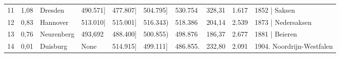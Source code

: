 \begin{tabular}{llllllllll}
11 &               1,08 &             Dresden &   490.571] &     477.807| &     504.795] &      530.754 &                 328,31 &  1.617 &               1852 | Saksen \\
12 &               0,83 &            Hannover &   513.010| &     515.001] &     516.343) &      518.386 &                 204,14 &  2.539 &          1873 | Nedersaksen \\
13 &               0,76 &          Neurenberg &    493,692 &     488.400] &     500.855) &      498.876 &                 186,37 &  2.677 &              1881 | Beieren \\
14 &               0,01 &            Duisburg &       None &     514.915| &     499.111] &     486.855. &                 232,80 &  2.091 &   1904. Noordrijn-Westfalen \\
\bottomrule
\end{tabular}
